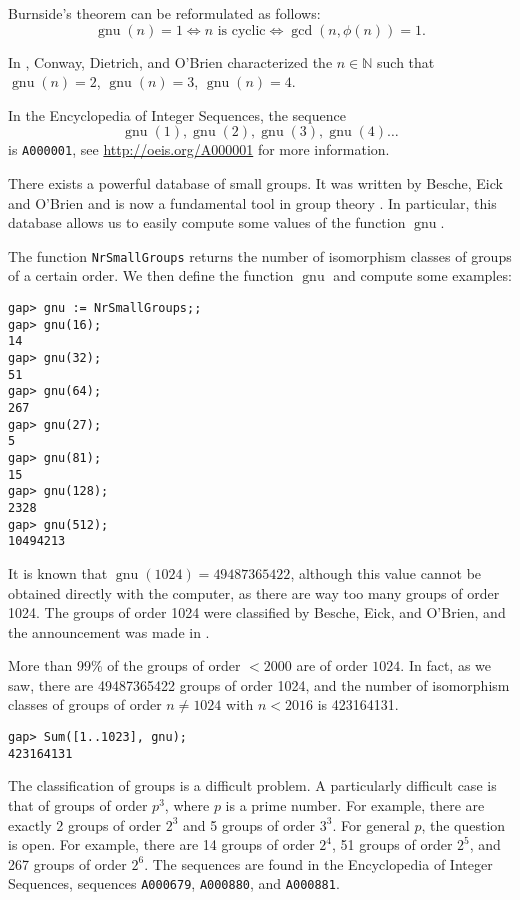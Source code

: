 Burnside's theorem can be reformulated as follows:
\[
\operatorname{gnu}(n)=1 \Longleftrightarrow \text{$n$ is cyclic} \Longleftrightarrow \gcd(n,\phi(n))=1.
\]

In \cite{MR2410121}, Conway, Dietrich, and O'Brien characterized the $n\in\mathbb{N}$ such that $\operatorname{gnu}(n)=2$, $\operatorname{gnu}(n)=3$, $\operatorname{gnu}(n)=4$.

In the Encyclopedia of Integer Sequences, the sequence
\[
\operatorname{gnu}(1),\operatorname{gnu}(2),\operatorname{gnu}(3),\operatorname{gnu}(4)\dots
\]
is \lstinline{A000001}, see \url{http://oeis.org/A000001} for more information.

There exists a powerful database of small groups. It was 
written by Besche, Eick and O'Brien and is now a fundamental tool in group theory \cite{MR1935567}. In particular, this database allows us to easily compute some values of the function $\operatorname{gnu}$.

The function \lstinline{NrSmallGroups} returns the number of isomorphism classes of groups of a certain order. We then define the function $\operatorname{gnu}$ and compute some examples:

\begin{lstlisting}
gap> gnu := NrSmallGroups;;
gap> gnu(16);
14
gap> gnu(32);
51
gap> gnu(64);
267
gap> gnu(27);
5
gap> gnu(81);
15
gap> gnu(128);
2328
gap> gnu(512);
10494213
\end{lstlisting}

It is known that $\operatorname{gnu}(1024)=49487365422$, although this value cannot be obtained directly with the computer, as there are way too many 
groups of order 1024. The groups of order 1024 were classified by Besche, Eick, and O'Brien, and the announcement was made in \cite{MR1826989}.

More than 99\% of the groups of order $<2000$ are of order $1024$. In fact, as we saw, there are 49487365422 groups of order 1024, and the number of isomorphism classes of groups of order $n\ne1024$ with $n<2016$ is 423164131.

\begin{lstlisting}
gap> Sum([1..1023], gnu);
423164131
\end{lstlisting}

The classification of groups is a difficult problem. A particularly difficult case is that of groups of order $p^3$, where $p$ is a prime number. For example, there are exactly 2 groups of order $2^3$ and 5 groups of order $3^3$. For general $p$, the question is open. For example, there are 14 groups of order $2^4$, 51 groups of order $2^5$, and 267 groups of order $2^6$. The sequences are found in the Encyclopedia of Integer Sequences, sequences \lstinline{A000679}, \lstinline{A000880}, and \lstinline{A000881}.

